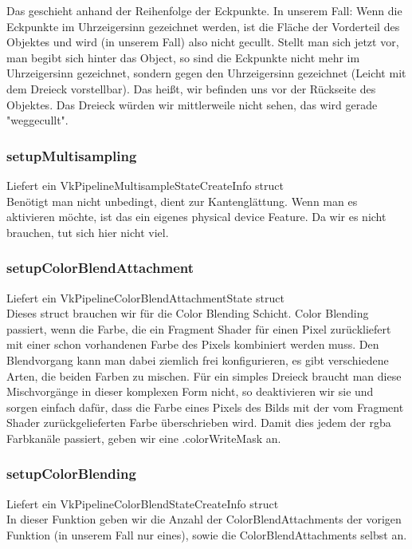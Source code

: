\documentclass[11pt,a4paper]{report}
\begin{document}
Das geschieht anhand der Reihenfolge der Eckpunkte. In unserem Fall: Wenn die Eckpunkte im Uhrzeigersinn gezeichnet werden, ist die Fläche der Vorderteil des Objektes und wird (in unserem Fall) also nicht gecullt. Stellt man sich jetzt vor, man begibt sich hinter das Object, so sind die Eckpunkte nicht mehr im Uhrzeigersinn gezeichnet, sondern gegen den Uhrzeigersinn gezeichnet (Leicht mit dem Dreieck vorstellbar). Das heißt, wir befinden uns vor der Rückseite des Objektes. Das Dreieck würden wir mittlerweile nicht sehen, das wird gerade "weggecullt".

\subsubsection{setupMultisampling}
Liefert ein VkPipelineMultisampleStateCreateInfo struct\\
Benötigt man nicht unbedingt, dient zur Kantenglättung. Wenn man es aktivieren möchte, ist das ein eigenes physical device Feature. Da wir es nicht brauchen, tut sich hier nicht viel.

\subsubsection{setupColorBlendAttachment}
Liefert ein VkPipelineColorBlendAttachmentState struct\\
Dieses struct brauchen wir für die Color Blending Schicht. Color Blending passiert, wenn die Farbe, die ein Fragment Shader für einen Pixel zurückliefert mit einer schon vorhandenen Farbe des Pixels kombiniert werden muss. Den Blendvorgang kann man dabei ziemlich frei konfigurieren, es gibt verschiedene Arten, die beiden Farben zu mischen. Für ein simples Dreieck braucht man diese Mischvorgänge in dieser komplexen Form nicht, so deaktivieren wir sie und sorgen einfach dafür, dass die Farbe eines Pixels des Bilds mit der vom Fragment Shader zurückgelieferten Farbe überschrieben wird. Damit dies jedem der rgba Farbkanäle passiert, geben wir eine .colorWriteMask an.

\subsubsection{setupColorBlending}
Liefert ein VkPipelineColorBlendStateCreateInfo struct\\
In dieser Funktion geben wir die Anzahl der ColorBlendAttachments der vorigen Funktion (in unserem Fall nur eines), sowie die ColorBlendAttachments selbst an.
\end{document}
